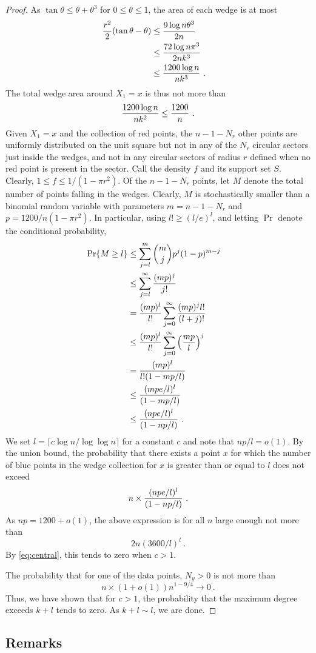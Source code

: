 \documentclass[lotsofwhite,charterfonts]{patmorin}
\newcommand{\PROB}{\Pr}
\begin{document}
\begin{proof}
As $\tan \theta \le \theta + \theta^3$ for $0 \le \theta \le 1$,
the area of each wedge is at most
\[
\begin{aligned}
{ r^2 \over 2} (\tan \theta - \theta)
&\le { 9 \log n \theta^3 \over 2n}  \cr
&\le { 72 \log n \pi^3 \over 2nk^3}  \cr
&\le { 1200 \log n \over n k^3} ~. \cr
\end{aligned}
\]
The total wedge area around $X_1 = x$ is thus not more
than
\[
{ 1200 \log n \over n k^2 } \le { 1200 \over n }~.
\]
Given $X_1 = x$ and the collection of red points,
the $n-1-N_r$ other points are uniformly distributed
on the unit square but not in any of the $N_r$ circular
sectors just inside the wedges, and not in 
any circular sectors of radius $r$ defined when no
red point is present in the sector. Call the density $f$
and its support set $S$. Clearly, 
$1 \le f 
\le 1/(1-\pi r^2)$.
Of the $n-1-N_r$ points, let $M$ denote the total
number of points falling in the wedges.
Clearly, $M$ is stochastically smaller
than a binomial random variable with parameters
$m = n-1-N_r$ and $p = 1200/n(1-\pi r^2)$.
In particular, using $l! \ge (l/e)^l$,
and letting $\PROB$ denote the conditional probability,
\[
\begin{aligned}
\PROB \{ M \ge l \}
&\le \sum_{j=l}^m {m \choose j} p^j (1-p)^{m-j} \cr
&\le \sum_{j=l}^\infty {(mp)^j \over j!}  \cr
&=   {(mp)^l \over l!} \sum_{j=0}^\infty {(mp)^j l! \over (l+j)!}  \cr
&\le {(mp)^l \over l!} \sum_{j=0}^\infty \left( {mp \over l} \right)^j  \cr
&=   {(mp)^l \over l! (1-mp/l)}  \cr
&\le   {(mpe/l)^l \over (1-mp/l)}  \cr
&\le   {(npe/l)^l \over (1-np/l)} ~. \cr
\end{aligned}
\]
We set $l = \lceil c \log n / \log \log n \rceil$ for a constant $c$
and note that $np/l = o(1)$.
By the union bound, 
the probability that there exists a point $x$
for which the number of blue points in the wedge collection
for $x$ is greater than or equal to $l$ does not
exceed 
\[
n \times {(npe/l)^l \over (1-np/l)} ~. 
\]
As $np = 1200+o(1)$, the above expression is for all $n$
large enough not more than
\[
2n (3600/l)^l~.
\]
By \eqref{eq:central}, this tends to zero when $c > 1$.

The probability that for one of the data points,
$N_y > 0$ is not more than
\[
n \times (1+o(1)) n^{1-9/4} \to 0~.
\]
Thus, we have shown that for $c > 1$, 
the probability that the maximum degree
exceeds $k+l$ tends to zero. As $k+l \sim l$, we are done.
\end{proof}

\subsection{Remarks}
\end{document}
